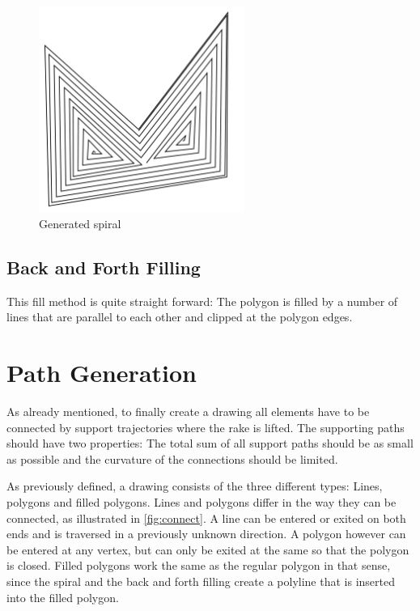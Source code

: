 \documentclass[10pt,twoside,a4paper]{report}
\begin{document}
\begin{figure}
\centering
\includegraphics[width=0.6\textwidth]{images/algorithms/spiral_fill/spiral_real.pdf}
\caption{Generated spiral} \label{fig:gen_spiral}
\end{figure}

\subsection{Back and Forth Filling}

This fill method is quite straight forward: The polygon is filled by a number of lines that are parallel to each other and clipped at the polygon edges. 

\section{Path Generation}
As already mentioned, to finally create a drawing all elements have to be connected by support trajectories where the rake is lifted. The supporting paths should have two properties: The total sum of all support paths should be as small as possible and the curvature of the connections should be limited.

As previously defined, a drawing consists of the three different types: Lines, polygons and filled polygons. Lines and polygons differ in the way they can be connected, as illustrated in \autoref{fig:connect}. A line can be entered or exited on both ends and is traversed in a previously unknown direction. A polygon however can be entered at any vertex, but can only be exited at the same so that the polygon is closed. Filled polygons work the same as the regular polygon in that sense, since the spiral and the back and forth filling create a polyline that is inserted into the filled polygon.
\end{document}
